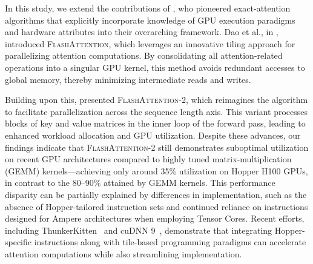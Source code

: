 In this study, we extend the contributions of \citet{dao2022flashattention}, who pioneered exact-attention algorithms that explicitly incorporate knowledge of GPU execution paradigms and hardware attributes into their overarching framework. Dao et al., in \citep{dao2022flashattention}, introduced \textsc{FlashAttention}, which leverages an innovative tiling approach for parallelizing attention computations. By consolidating all attention-related operations into a singular GPU kernel, this method avoids redundant accesses to global memory, thereby minimizing intermediate reads and writes.

Building upon this, \citet{dao2023flashattention2} presented \textsc{FlashAttention-2}, which reimagines the algorithm to facilitate parallelization across the sequence length axis. This variant processes blocks of key and value matrices in the inner loop of the forward pass, leading to enhanced workload allocation and GPU utilization. Despite these advances, our findings indicate that \textsc{FlashAttention-2} still demonstrates suboptimal utilization on recent GPU architectures compared to highly tuned matrix-multiplication (GEMM) kernels—achieving only around 35\% utilization on Hopper H100 GPUs, in contrast to the 80–90\% attained by GEMM kernels. This performance disparity can be partially explained by differences in implementation, such as the absence of Hopper-tailored instruction sets and continued reliance on instructions designed for Ampere architectures when employing Tensor Cores. Recent efforts, including ThunkerKitten~\citep{spector2024thunder} and cuDNN 9~\citep{cudnn9}, demonstrate that integrating Hopper-specific instructions along with tile-based programming paradigms can accelerate attention computations while also streamlining implementation.

